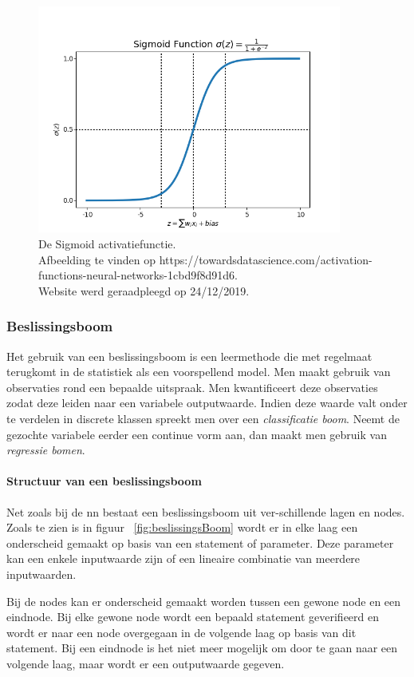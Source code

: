 			\begin{figure}
				\centering
				\includegraphics[width=100mm]{afbeeldingen/sigmoid2.PNG}
				\caption{De Sigmoid activatiefunctie. \\Afbeelding te vinden op https://towardsdatascience.com/activation-functions-neural-networks-1cbd9f8d91d6. \\ Website werd geraadpleegd op 24/12/2019.}
				\label{fig:sigmoid}
			\end{figure}
	\subsubsection{Beslissingsboom} 
	Het gebruik van een beslissingsboom is een leermethode die met regelmaat terugkomt in de statistiek als een voorspellend model. Men maakt gebruik van observaties rond een bepaalde uitspraak. Men kwantificeert deze observaties zodat deze leiden naar een variabele outputwaarde. Indien deze waarde valt onder te verdelen in discrete klassen spreekt men over een \textit{classificatie boom}. Neemt de gezochte variabele eerder een continue vorm aan, dan maakt men gebruik van \textit{regressie bomen}.
	

	
		\paragraph{Structuur van een beslissingsboom}			
		Net zoals bij de \gls{nn} bestaat een beslissingsboom uit ver\hyp{}schillende lagen en nodes. Zoals te zien is in figuur ~\ref{fig:beslissingsBoom} wordt er in elke laag een onderscheid gemaakt op basis van een statement of parameter. Deze parameter kan een enkele inputwaarde zijn of een lineaire combinatie van meerdere inputwaarden. 
		
		Bij de nodes kan er onderscheid gemaakt worden tussen een gewone node en een eindnode. Bij elke gewone node wordt een bepaald statement geverifieerd en wordt er naar een node overgegaan in de volgende laag op basis van dit statement. Bij een eindnode is het niet meer mogelijk om door te gaan naar een volgende laag, maar wordt er een outputwaarde gegeven.
		

